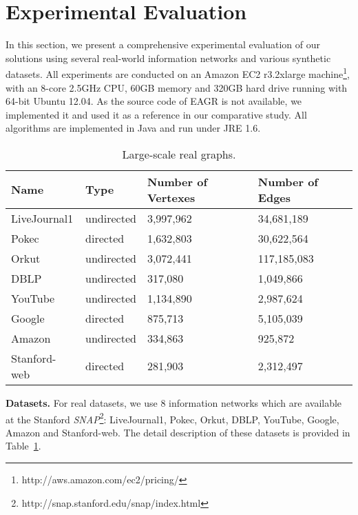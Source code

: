 \section{Experimental Evaluation}\label{gw:sec:exp}
In this section, we present a comprehensive experimental evaluation 
of our solutions using several real-world information networks and 
various synthetic datasets. 
All experiments are conducted on an 
Amazon EC2 r3.2xlarge machine\footnote{http://aws.amazon.com/ec2/pricing/}, 
with an 8-core 2.5GHz CPU, 60GB memory and 320GB hard drive 
running with 64-bit Ubuntu 12.04. As the source code of EAGR is not
available, we implemented it and used it as a reference in our comparative
study.  
All algorithms are implemented in Java and run under JRE 1.6.

\begin{table}[h]
\caption{Large-scale real graphs.}
\label{tab:realdata}
\centering
\begin{tabular}{|l|l|l|l|}
\hline 
\rule[-1ex]{0pt}{2.5ex} Name & Type & Number of Vertexes & Number of Edges \\ 
\hline 
\rule[-1ex]{0pt}{2.5ex} LiveJournal1 & undirected & 3,997,962 & 34,681,189 \\ 
\hline 
\rule[-1ex]{0pt}{2.5ex} Pokec & directed & 1,632,803 & 30,622,564 \\ 
\hline 
\rule[-1ex]{0pt}{2.5ex} Orkut & undirected & 3,072,441 & 117,185,083 \\ 
\hline 
\rule[-1ex]{0pt}{2.5ex} DBLP & undirected & 317,080 & 1,049,866 \\ 
\hline 
\rule[-1ex]{0pt}{2.5ex} YouTube & undirected & 1,134,890 & 2,987,624 \\ 
\hline 
\rule[-1ex]{0pt}{2.5ex} Google & directed & 875,713 & 5,105,039 \\ 
\hline 
\rule[-1ex]{0pt}{2.5ex} Amazon & undirected & 334,863 & 925,872 \\ 
\hline 
\rule[-1ex]{0pt}{2.5ex} Stanford-web & directed & 281,903 &  2,312,497 \\ 
\hline 
\end{tabular}
\end{table}


\textbf{Datasets.} For real datasets, we use 8 information networks 
which are available at the Stanford \emph{SNAP}\footnote{http://snap.stanford.edu/snap/index.html}: 
LiveJournal1, Pokec, Orkut, DBLP, YouTube, Google, Amazon and Stanford-web. 
The detail description of these datasets is provided in 
Table~\ref{tab:realdata}. 

